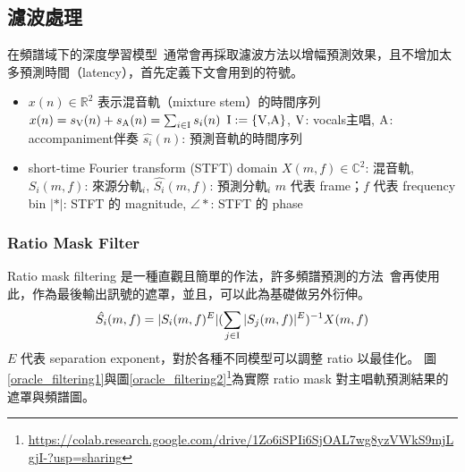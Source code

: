 \subsection{濾波處理}
在頻譜域下的深度學習模型~\cite{hennequin2020spleeter,stoter20182018}通常會再採取濾波方法以增幅預測效果，且不增加太多預測時間（latency），首先定義下文會用到的符號。
\begin{itemize}
    \item $x(n)\in\mathbb{R}^2$ 表示混音軌（mixture stem）的時間序列
    \subitem $x(n)=s_{\textup{V}}{(n)} + s_{\textup{A}}{(n)} = \sum_{i\in\textup{I}}{s_i{(n)}}$
    \subitem $\textup{I} := \{\textup{V,A}\}$, $\textup{V}$: vocals主唱, $\textup{A}$: accompaniment伴奏
    \subitem $\hat{s_i}{(n)}$: 預測音軌的時間序列
    \item short-time Fourier transform (STFT) domain
    \subitem $X(m,f)\in\mathbb{C}^2$: 混音軌, $S_i(m,f)$: 來源分軌$_i$, $\hat{S_i}{(m,f)}$: 預測分軌$_i$
    \subitem $m$ 代表 frame；$f$ 代表 frequency bin
    \subitem $\vert\ast\vert$: STFT 的 magnitude, $\angle \ast$: STFT 的 phase
\end{itemize}

\subsubsection{Ratio Mask Filter}
Ratio mask filtering 是一種直觀且簡單的作法，許多頻譜預測的方法~\cite{bao_abdulla_2018,stoter20182018}會再使用此，作為最後輸出訊號的遮罩，並且，可以此為基礎做另外衍伸。
\begin{equation*}
    \hat{S_i}{(m,f)} = \vert S_i(m,f)^E\vert (\sum_{j\in\textup{I}}\vert S_j(m,f)\vert^E)^{-1}X(m,f)
\end{equation*}
$E$ 代表 separation exponent，對於各種不同模型可以調整 ratio 以最佳化。
圖\ref{oracle_filtering1}與圖\ref{oracle_filtering2}\footnote{\url{https://colab.research.google.com/drive/1Zo6iSPIi6SjOAL7wg8yzVWkS9mjLgjI-?usp=sharing}}為實際 ratio mask 對主唱軌預測結果的遮罩與頻譜圖。

